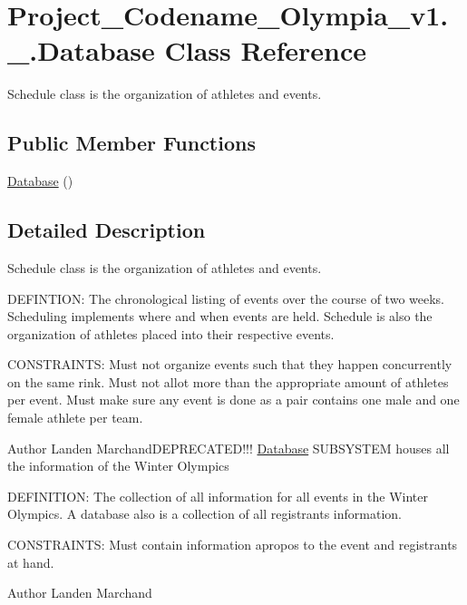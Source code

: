 \hypertarget{classProject__Codename__Olympia__v1_1_1__0_1_1Database}{}\section{Project\+\_\+\+Codename\+\_\+\+Olympia\+\_\+v1.\+\_.\+Database Class Reference}
\label{classProject__Codename__Olympia__v1_1_1__0_1_1Database}


Schedule class is the organization of athletes and events.  


\subsection*{Public Member Functions}
\begin{DoxyCompactItemize}
\item 
\hyperlink{classProject__Codename__Olympia__v1_1_1__0_1_1Database_a21b7504aee323670b290e303530b3da7}{Database} ()
\end{DoxyCompactItemize}


\subsection{Detailed Description}
Schedule class is the organization of athletes and events. 

D\+E\+F\+I\+N\+T\+I\+ON\+: The chronological listing of events over the course of two weeks. Scheduling implements where and when events are held. Schedule is also the organization of athletes placed into their respective events.

C\+O\+N\+S\+T\+R\+A\+I\+N\+TS\+: Must not organize events such that they happen concurrently on the same rink. Must not allot more than the appropriate amount of athletes per event. Must make sure any event is done as a pair contains one male and one female athlete per team.\begin{DoxyAuthor}{Author}
Landen Marchand\+D\+E\+P\+R\+E\+C\+A\+T\+E\+D!!! \hyperlink{classProject__Codename__Olympia__v1_1_1__0_1_1Database}{Database} S\+U\+B\+S\+Y\+S\+T\+EM houses all the information of the Winter Olympics
\end{DoxyAuthor}
D\+E\+F\+I\+N\+I\+T\+I\+ON\+: The collection of all information for all events in the Winter Olympics. A database also is a collection of all registrants information.

C\+O\+N\+S\+T\+R\+A\+I\+N\+TS\+: Must contain information apropos to the event and registrants at hand.\begin{DoxyAuthor}{Author}
Landen Marchand 
\end{DoxyAuthor}


